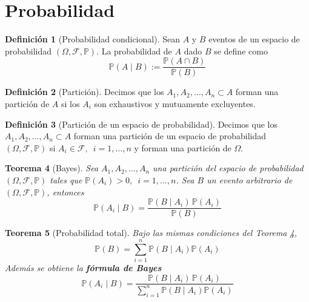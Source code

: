 \documentclass[11pt,a4paper]{book}
\newtheorem{teorema}{Teorema}[section]
\theoremstyle{definition}%
\newtheorem{definicion}[teorema]{Definici\'on}
\newcommand{\Probsymb}{\mathds{P}}
\begin{document}
        \section{Probabilidad}
            \begin{definicion}[Probabilidad condicional]
                Sean $A$ y $B$ eventos de un espacio de probabilidad $(\Omega,\mathcal{F},\Probsymb)$. La probabilidad de $A$ dado $B$ se define como
                \begin{equation}
                    \Probsymb(A \mid B) :=\dfrac{\Probsymb(A\cap B)}{\Probsymb(B)}
                \end{equation}
            \end{definicion}
            \begin{definicion}[Partición]
                Decimos que los $A_{1}, A_{2}, \dots, A_{n}\subset A$ forman una partición de $A$ si los $A_i$ son exhaustivos y mutuamente excluyentes.
            \end{definicion}
            \begin{definicion}[Partición de un espacio de probabilidad]
                Decimos que los $A_{1}, A_{2}, \dots, A_{n}\subset A$ forman una partición de un espacio de probabilidad $(\Omega,\mathcal{F},\Probsymb)$ si $A_i\in\mathcal{F},\enspace i =1,\ldots,n$ y forman una partición de $\Omega$.
            \end{definicion}
            \begin{teorema}[Bayes]\label{T. bayes}
                Sea $A_{1}, A_{2}, \dots, A_{n}$ una partición del espacio de probabilidad $(\Omega,\mathcal{F},\Probsymb)$ tales que $\Probsymb(A_i) > 0,\enspace i=1,\ldots,n$. Sea $B$ un evento arbitrario de $(\Omega,\mathcal{F},\Probsymb)$, entonces
                \begin{equation}
                    \Probsymb(A_i \mid B) = \frac{\Probsymb(B \mid A_i)\, \Probsymb(A_i)}{\Probsymb(B)}
                \end{equation}
            \end{teorema}
            \begin{teorema}[Probabilidad total]
                Bajo las mismas condiciones del Teorema \ref{T. bayes},
                \begin{equation}
                    \Probsymb(B) = \sum_{i=1}^n \Probsymb(B \mid A_i)\Probsymb(A_i)
                \end{equation}
                Además se obtiene la \textbf{fórmula de Bayes}
                \begin{equation}
                    \Probsymb(A_i \mid B) = \frac{\Probsymb(B \mid A_i)\, \Probsymb(A_i)}{\sum_{i=1}^n \Probsymb(B \mid A_i)\Probsymb(A_i)}
                \end{equation}
            \end{teorema}
\end{document}
